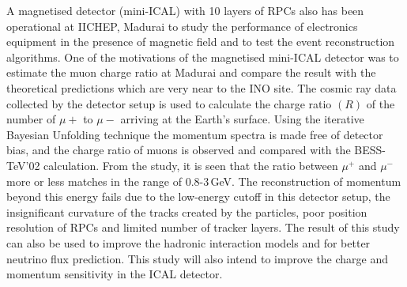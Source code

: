 A magnetised detector (mini-ICAL) with 10 layers of RPCs also has been
operational at IICHEP, Madurai to study the performance of electronics
equipment in the presence of magnetic field and to test the event
reconstruction algorithms. One of the motivations of the magnetised
mini-ICAL detector was to estimate the muon charge ratio at Madurai
and compare the result with the theoretical predictions which are very
near to the INO site.
The cosmic ray data collected by the detector setup is used to
calculate the charge ratio $(R)$ of the number of $\mu+$ to $\mu-$
arriving at the Earth's surface. Using the iterative Bayesian
Unfolding technique the momentum spectra is made free of detector
bias, and the charge ratio of muons is observed and compared with the
BESS-TeV'02 calculation.
From the study, it is seen that the ratio between $\mu^{+}$ and
$\mu^{-}$ more or less matches in the range of 0.8-3\,GeV.
The reconstruction of momentum beyond this energy fails due to
the low-energy cutoff in this detector setup, the insignificant
curvature of the tracks created by the particles, poor position
resolution of RPCs and limited number of tracker layers. The result
of this study can also be used to improve the hadronic interaction
models and for better neutrino flux prediction. This study will
also intend to improve the charge and momentum sensitivity in the
ICAL detector.
